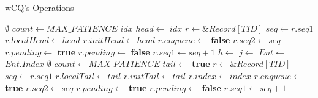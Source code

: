 \begin{algorithm}[!ht]
    \centering
    \captionsetup{justification=centering}
    \caption{wCQ's Operations \cite{wCQWaitFreeQueue}}
    \label{alg:wcq-ops}
    \scriptsize
    \begin{algorithmic}[1]
                \State \Return $\emptyset$ 
            \EndIf
            \State {}
            \State {}
            \State $count \gets MAX\_PATIENCE$
                \State $idx$
                \State $head \gets $ 
                 \Return $idx$
                \EndIf
            \EndWhile
            \State {}
            \State $r \gets \&Record[TID]$
            \State $seq \gets r.seq1$
            \State $r.localHead \gets head$
            \State $r.initHead \gets head$
            \State $r.enqueue \gets $ \textbf{false}
            \State $r.seq2 \gets seq$
            \State $r.pending \gets $ \textbf{true}
            \State {}
            \State $r.pending \gets $ \textbf{false}
            \State $r.seq1 \gets seq + 1$
            \State {}
            \State $h \gets $ 
            \State $j \gets $ 
            \State $Ent \gets $ 
                \State {}
                \State \Return $Ent.Index$
            \EndIf
            \State \Return $\emptyset$
        \EndFunction
        \State
            \State {}
            \State {}
            \State $count \gets MAX\_PATIENCE$
                \State $tail \gets $ 
                 \Return \textbf{true}
                \EndIf
            \EndWhile
            \State {}
            \State $r \gets \&Record[TID]$
            \State $seq \gets r.seq1$
            \State $r.localTail \gets tail$
            \State $r.initTail \gets tail$
            \State $r.index \gets index$
            \State $r.enqueue \gets $ \textbf{true}
            \State $r.seq2 \gets seq$
            \State $r.pending \gets $ \textbf{true}
            \State {}
            \State $r.pending \gets $ \textbf{false}
            \State $r.seq1 \gets seq + 1$
        \EndFunction
    \end{algorithmic}
\end{algorithm}

